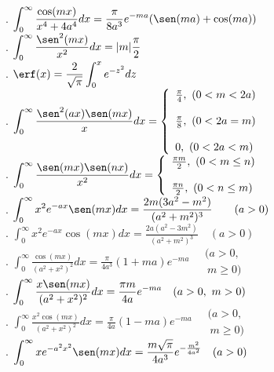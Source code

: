 . $\displaystyle \int_0^\infty \frac{\cos(mx)}{x^4+4a^4}dx=\frac{\pi}{8a^3}e^{-ma}(\sen(ma)+\cos(ma)) $ \\
. $\displaystyle \int_0^\infty \frac{\sen^2(mx)}{x^2}dx=|m|\frac{\pi}{2} $\\
. $\displaystyle \erf(x)=\frac{2}{\sqrt{\pi}}\int_0^x e^{-z^2}dz $\\
. $\displaystyle \int_0^\infty \frac{\sen^2(ax)\sen(mx)}{x}dx=\left\{\begin{array}{l}\frac{\pi }{4},\ (0<m<2a)\\\\\frac{\pi }{8},\ (0<2a=m)\\\\ 0,\ (0<2a<m) \end{array}\right. $\\
. $\displaystyle \int_0^\infty \frac{\sen(mx)\sen(nx)}{x^2}dx=\left\{\begin{array}{l}\frac{\pi m}{2},\ (0<m\leq n)\\\\\frac{\pi n}{2},\ (0<n\leq m) \end{array}\right. $ \\
. $\displaystyle \int_0^\infty x^2e^{-ax}\sen(mx)dx=\frac{2m(3a^2-m^2)}{(a^2+m^2)^3}\qquad (a>0) $\\
. $\displaystyle \int_0^\infty x^2e^{-ax}\cos(mx)dx=\frac{2a(a^2-3m^2)}{(a^2+m^2)^3}\quad (a>0) $ \\
. $\displaystyle \int_0^\infty \frac{\cos(mx)}{(a^2+x^2)^2}dx=\frac{\pi}{4a^3}(1+ma)e^{-ma}\quad \begin{array}{l}\!\!(a>0,\\ \ m\geq 0)\end{array} $\\
. $\displaystyle \int_0^\infty \frac{x\sen(mx)}{(a^2+x^2)^2}dx=\frac{\pi m}{4a}e^{-ma} \quad (a>0,\ m>0) $ \\
. $\displaystyle \int_0^\infty \frac{x^2\cos(mx)}{(a^2+x^2)^2}dx=\frac{\pi}{4a}(1-ma)e^{-ma}\quad \begin{array}{l}\!\!(a>0,\\ \ m\geq 0)\end{array} $\\
. $\displaystyle \int_0^\infty xe^{-a^2x^2}\sen(mx)dx=\frac{ m \sqrt{\pi}}{4a^3}e^{-\frac{m^2}{4a^2}} \quad (a>0) $




